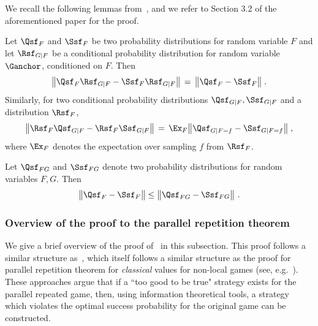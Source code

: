 We recall the following lemmas from~\cite[Section 3.2]{bavarianAnchoredParallelRepetition2021}, and we refer to Section 3.2 of the aforementioned paper for the proof. 


\begin{lemma}\label{lem:trivial}
	Let $\Qsf_F$ and $\Ssf_F$ be two probability distributions for  random variable $F$ and let $\Rsf_{G | F}$ be a conditional probability distribution for random variable $\Ganchor$, conditioned on $F$. Then
	\[ \big\| \Qsf_{F} \Rsf_{G|F} - \Ssf_{F} \Rsf_{G|F}\big\|\,=\, \big\|\Qsf_{F}-\Ssf_{F}\big\|\;. \]
	Similarly, for two conditional probability distributions $\Qsf_{G|F}, \Ssf_{G|F}$ and a distribution $\Rsf_F$, 
	\[
	\big\| \Rsf_F \Qsf_{G|F} - \Rsf_F \Ssf_{G|F} \big\| \,=\, \Ex_F \big\| \Qsf_{G|F = f} - \Ssf_{G|F=f} \big\|\;,
	\]
	where $\Ex_F$ denotes the expectation over sampling $f$ from $\Rsf_F$.
\end{lemma}

\begin{lemma}\label{lem:data-processing}
	Let $\Qsf_{FG}$ and $\Ssf_{FG}$ denote two probability distributions for random variables $F,G$. Then 
	\[
	\big \| \Qsf_{F} - \Ssf_F \big \| \leq \big \| \Qsf_{FG} - \Ssf_{FG} \big \|~.
	\]
\end{lemma}

\subsubsection{Overview of the proof to the parallel repetition theorem} \label{sec:paralleloverview}

We give a brief overview of the proof of~ in this subsection. This proof follows a similar structure as~\cite{bavarianAnchoredParallelRepetition2021}, which itself follows a similar structure as the proof for parallel repetition theorem for \textit{classical} values for non-local games (see, e.g.~\cite{razParallelRepetitionTheorem1995a}). These approaches argue that if a ``too good to be true" strategy exists for the parallel repeated game, then, using information theoretical tools, a strategy which violates the optimal success probability for the original game can be constructed. 

